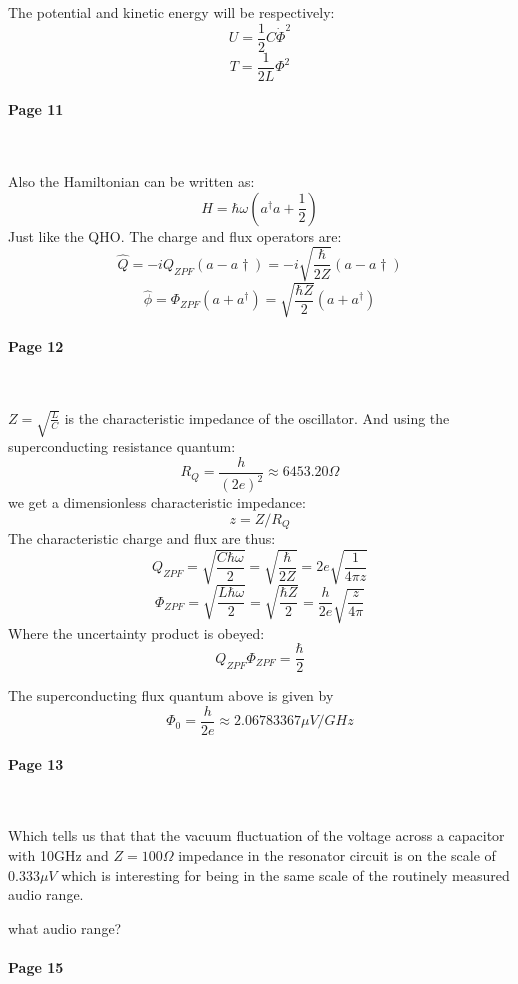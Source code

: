 \documentclass[12pt]{article}
\numberwithin{equation}{subsection}
\newcommand\ask[1]{
{\color{red}
#1
}
}
\newcommand\page[1]{
{
\color{blue}\paragraph{
Page #1
}\mbox{}\\
}
}
\begin{document}
The potential and kinetic energy will be respectively:
\begin{equation}
    U=\frac{1}{2}C\dot\Phi^2
\end{equation}
\begin{equation}
    T = \frac{1}{2L} \Phi^2
\end{equation}
\page{11}
Also the Hamiltonian can be written as:
\begin{equation}
    H= \hbar\omega(a^\dagger a + \frac{1}{2})
\end{equation}
Just like the QHO.
The charge and flux operators are:
\begin{equation}
    \hat Q = - i Q_{ZPF} (a-a \dagger) = - i \sqrt{\frac{\hbar}{2Z}} (a-a \dagger)
\end{equation}
\begin{equation}
    \hat \phi = \Phi_{ZPF} (a+a^\dagger)=  \sqrt{\frac{\hbar Z}{2}}(a+a^\dagger)
\end{equation}

\page{12}
$Z=\sqrt{\frac{L}{C}}$ is the characteristic impedance of the oscillator.
And using the superconducting resistance quantum:
\begin{equation}
    R_Q=\frac{h}{(2e)^2} \approx 6453.20 \Omega
\end{equation}
we get a dimensionless characteristic impedance:
\begin{equation}
    z= Z/R_Q
\end{equation}
The characteristic charge and flux are thus:
\begin{equation}
    Q_{ZPF}= \sqrt{\frac{C\hbar \omega }{2}} = \sqrt{\frac{\hbar}{2Z}} =2e \sqrt{\frac{1}{4\pi z}}
\end{equation}
\begin{equation}
    \Phi_{ZPF}= \sqrt{\frac{L\hbar \omega }{2}} = \sqrt{\frac{\hbar Z}{2}}=\frac{h}{2e} \sqrt{\frac{z}{4\pi }}
\end{equation}
Where the uncertainty product is obeyed:
\begin{equation}
   Q_{ZPF}\Phi_{ZPF} = \frac{\hbar}{2} 
\end{equation}

The superconducting flux quantum above is given by 
\begin{equation}
    \Phi_0 = \frac{h}{2e} \approx 2.06783367 \mu V/GHz
\end{equation}
\page{13}
Which tells us that that the vacuum fluctuation of the voltage across a capacitor with 10GHz and $Z=100\Omega$ impedance in the resonator circuit is on the scale of $0.333\mu V$ which is interesting for being in the same scale of the routinely measured audio range. 
\ask{what audio range?}
\page{15}
\end{document}
